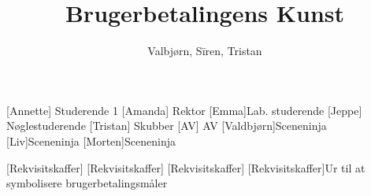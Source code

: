 \documentclass[a4paper,11pt]{article}
\title{Brugerbetalingens Kunst}
\author{Valbjørn, Sïren, Tristan}
\begin{document}
\maketitle

\begin{roles}
  [Annette] Studerende 1
	[Amanda] Rektor
	[Emma]Lab. studerende
	[Jeppe] Nøglestuderende
	[Tristan] Skubber
	[AV] AV
	[Valdbjørn]Sceneninja
	[Liv]Sceneninja
	[Morten]Sceneninja
\end{roles}

\begin{props}
	[Rekvisitskaffer]
	[Rekvisitskaffer]
	[Rekvisitskaffer]
	[Rekvisitskaffer]Ur til at symbolisere brugerbetalingsmåler
\end{props}
\end{document}
